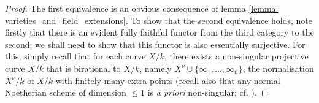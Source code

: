             \begin{proof}
                The first equivalence is an obvious consequence of lemma \ref{lemma: varieties_and_field_extensions}. To show that the second equivalence holds, note firstly that there is an evident fully faithful functor from the third category to the second; we shall need to show that this functor is also essentially surjective. For this, simply recall that for each curve $X/k$, there exists a non-singular projective curve $\tilde{X}/k$ that is birational to $X/k$, namely $X^{\nu} \cup \{\infty_1, ..., \infty_n\}$, the normalisation $X^{\nu}/k$ of $X/k$ with finitely many extra points (recall also that any normal Noetherian scheme of dimension $\leq 1$ is \textit{a priori} non-singular; cf. \cite[\href{https://stacks.math.columbia.edu/tag/0BX2}{Tag 0BX2}]{stacks}).
            \end{proof}
            
